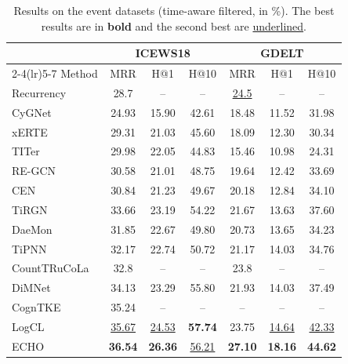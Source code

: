 \documentclass[runningheads]{llncs}
\makeatletter
\newcommand{\model}{ECHO}
\newcommand{\hone}{H@1}
\newcommand{\hten}{H@10}
\makeatother
\begin{document}
\begin{table}[t]
  \centering
  \caption{Results on the event datasets (time-aware filtered, in \%). The best results are in \textbf{bold} and the second best are \underline{underlined}.}
  \label{tab:main}
  \setlength{\tabcolsep}{5pt}
  \small
  \begin{tabular}{l ccc ccc}
    \toprule
    & \multicolumn{3}{c}{ICEWS18} & \multicolumn{3}{c}{GDELT} \\
    \cmidrule(lr){2-4}\cmidrule(lr){5-7}
    Method & MRR & \hone{} & \hten{} & MRR & \hone{} & \hten{} \\
    \midrule
    Recurrency~\cite{gastinger2024history} & 28.7 & -- & -- & \underline{24.5} & -- & -- \\
    CyGNet~\cite{zhu2021cygnet} & 24.93 & 15.90 & 42.61 & 18.48 & 11.52 & 31.98 \\
    xERTE~\cite{han2021xerte} & 29.31 & 21.03 & 45.60 & 18.09 & 12.30 & 30.34 \\
    TITer~\cite{sun2021titer} & 29.98 & 22.05 & 44.83 & 15.46 & 10.98 & 24.31 \\
    RE-GCN~\cite{li2021regcn} & 30.58 & 21.01 & 48.75 & 19.64 & 12.42 & 33.69 \\
    CEN~\cite{li2022cen} & 30.84 & 21.23 & 49.67 & 20.18 & 12.84 & 34.10 \\
    TiRGN~\cite{li2022tirgn} & 33.66 & 23.19 & 54.22 & 21.67 & 13.63 & 37.60 \\
    DaeMon~\cite{dong2023daemon} & 31.85 & 22.67 & 49.80 & 20.73 & 13.65 & 34.23 \\
    TiPNN~\cite{dong2024tipnn} & 32.17 & 22.74 & 50.72 & 21.17 & 14.03 & 34.76 \\
    CountTRuCoLa~\cite{gastinger2026counttrucola} & 32.8 & -- & -- & 23.8 & -- & -- \\
    DiMNet~\cite{dong2025dimnet} & 34.13 & 23.29 & 55.80 & 21.93 & 14.03 & 37.49 \\
    CognTKE~\cite{chen2025cogntke} & 35.24 & -- & -- & -- & -- & -- \\
    LogCL~\cite{chen2024logcl} & \underline{35.67} & \underline{24.53} & \textbf{57.74} & 23.75 & \underline{14.64} & \underline{42.33} \\
    \midrule
    \model{} & \textbf{36.54} & \textbf{26.36} & \underline{56.21} & \textbf{27.10} & \textbf{18.16} & \textbf{44.62} \\
    \bottomrule
  \end{tabular}
\end{table}
\end{document}
